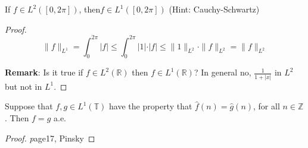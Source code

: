 \documentclass[12pt]{article}
\newenvironment{proposition}[1][Proposition.]{\begin{trivlist}
\item[\hskip \labelsep {\bfseries #1}]}{\end{trivlist}}
\begin{document}
\begin{proposition} If $f \in L^2([0,2\pi])$, then$ f \in L^1([0,2\pi])$ (Hint: Cauchy-Schwartz) 
\end{proposition}

\begin{proof}
\[
\| f \| _{L^1} = \int_0^{2\pi}\vert f \vert \leqslant \int_0^{2\pi}\vert 1 \vert \cdot \vert f \vert \leqslant \| 1 \| _{L^2} \cdot \| f \| _{L^2}  = \| f \| _{L^2}
\]

\textbf{Remark}: Is it true if $f \in L^2(\mathbb{R})$ then $f \in L^1(\mathbb{R})$? In general no, $\frac{1}{1 + |x|}$ in $L^2$ but not in $L^1$.
\end{proof}

\begin{proposition}
Suppose that $f, g \in L^1(\mathbb{T})$ have the property that $\hat{f}(n) = \hat{g}(n)$, for all $n \in \mathbb{Z}$. Then $f = g$ a.e. 
\end{proposition}
\begin{proof}
{\textit page17, Pinsky}
\end{proof}
\end{document}
